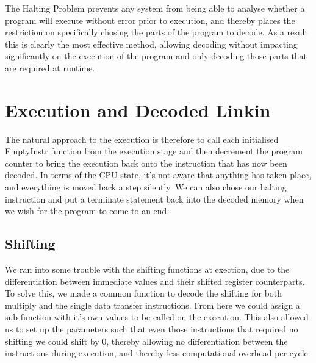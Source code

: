\documentclass[11pt]{article}
\begin{document}
The Halting Problem prevents any system from being able to analyse whether a program will execute without error prior to execution, and thereby places the restriction on specifically chosing the parts of the program to decode. As a result this is clearly the most effective method, allowing decoding without impacting significantly on the execution of the program and only decoding those parts that are required at runtime.

\section{Execution and Decoded Linkin}

The natural approach to the execution is therefore to call each initialised EmptyInstr function from the execution stage and then decrement the program counter to bring the execution back onto the instruction that has now been decoded. In terms of the CPU state, it's not aware that anything has taken place, and everything is moved back a step silently. We can also chose our halting instruction and put a terminate statement back into the decoded memory when we wish for the program to come to an end.

\subsection{Shifting}

We ran into some trouble with the shifting functions at exection, due to the differentiation between immediate values and their shifted register counterparts. To solve this, we made a common function to decode the shifting for both multiply and the single data transfer instructions. From here we could assign a sub function with it's own values to be called on the execution. This also allowed us to set up the parameters such that even those instructions that required no shifting we could shift by 0, thereby allowing no differentiation between the instructions during execution, and thereby less computational overhead per cycle.
\end{document}
